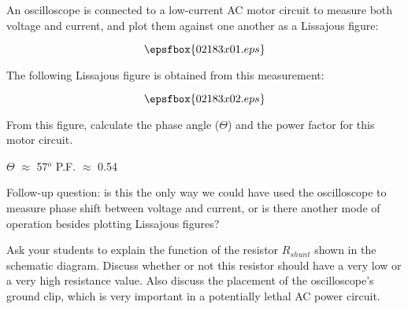 

An oscilloscope is connected to a low-current AC motor circuit to measure both voltage and current, and plot them against one another as a Lissajous figure:

$$\epsfbox{02183x01.eps}$$

The following Lissajous figure is obtained from this measurement:

$$\epsfbox{02183x02.eps}$$

From this figure, calculate the phase angle ($\Theta$) and the power factor for this motor circuit.







$\Theta$ $\approx$ 57$^{o}$ \hskip 20pt P.F. $\approx$ 0.54

\vskip 10pt

Follow-up question: is this the only way we could have used the oscilloscope to measure phase shift between voltage and current, or is there another mode of operation besides plotting Lissajous figures?







Ask your students to explain the function of the resistor $R_{shunt}$ shown in the schematic diagram.  Discuss whether or not this resistor should have a very low or a very high resistance value.  Also discuss the placement of the oscilloscope's ground clip, which is very important in a potentially lethal AC power circuit.




